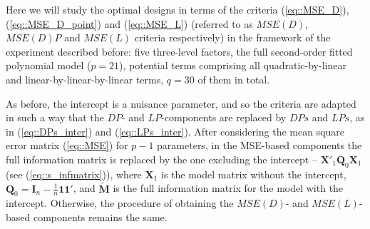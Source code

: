 Here we will study the optimal designs in terms of the criteria (\ref{eq::MSE_D}), (\ref{eq::MSE_D_point}) and (\ref{eq::MSE_L}) (referred to as $MSE(D)$, $MSE(D)P$ and $MSE(L)$ criteria respectively) in the framework of the experiment described before: five three-level factors, the full second-order fitted polynomial model ($p=21$), potential terms comprising all quadratic-by-linear and linear-by-linear-by-linear terms, $q=30$ of them in total. 

As before, the intercept is a nuisance parameter, and so the criteria are adapted in such a way that the $DP$- and $LP$-components are replaced by $DPs$ and $LPs$, as in (\ref{eq::DPs_inter}) and (\ref{eq::LPs_inter}). After considering the mean square error matrix (\ref{eq::MSE}) for $p-1$ parameters, in the MSE-based components the full information matrix is replaced by the one excluding the intercept -- $\bm{X}'_{1}\bm{Q}_0\bm{X}_{1}$ (see (\ref{eq::s_infmatrix})), where $\bm{X}_1$ is the model matrix without the intercept, $\bm{Q}_0=\bm{I}_n-\frac{1}{n}\bm{11}'$, and $\bm{\tilde{M}}$ is the full information matrix for the model with the intercept. Otherwise, the procedure of obtaining the $MSE(D)$- and $MSE(L)$-based components remains the same.

